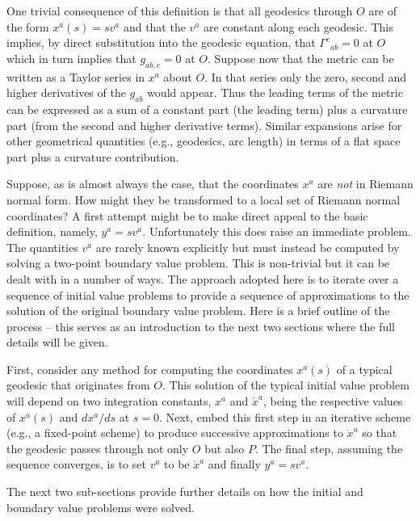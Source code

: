 \documentclass[a4paper,12pt]{article}
\numberwithin{equation}{section}
\begin{document}
One trivial consequence of this definition is that all geodesics through $O$ are of the form
$x^a(s) = s v^a$ and that the $v^a$ are constant along each geodesic. This implies, by
direct substitution into the geodesic equation, that $\Gamma^c{}_{ab}=0$ at $O$ which in
turn implies that $g_{ab,c}=0$ at $O$. Suppose now that the metric can be written as a
Taylor series in $x^a$ about $O$. In that series only the zero, second and higher
derivatives of the $g_{ab}$ would appear. Thus the leading terms of the metric can be
expressed as a sum of a constant part (the leading term) plus a curvature part (from the
second and higher derivative terms). Similar expansions arise for other geometrical
quantities (e.g., geodesics, arc length) in terms of a flat space part plus a curvature
contribution.

Suppose, as is almost always the case, that the coordinates $x^a$ are \emph{not} in Riemann
normal form. How might they be transformed to a local set of Riemann normal coordinates? A
first attempt might be to make direct appeal to the basic definition, namely, $y^a = s v^a$.
Unfortunately this does raise an immediate problem. The quantities $v^a$ are rarely known
explicitly but must instead be computed by solving a two-point boundary value problem. This
is non-trivial but it can be dealt with in a number of ways. The approach adopted here is
to iterate over a sequence of initial value problems to provide a sequence of approximations
to the solution of the original boundary value problem. Here is a brief outline of the
process -- this serves as an introduction to the next two sections where the full details
will be given.

First, consider any method for computing the coordinates $x^a(s)$ of a typical geodesic that
originates from $O$. This solution of the typical initial value problem will depend on two
integration constants, $x^a$ and ${\Dot x}^a$, being the respective values of $x^a(s)$ and
$dx^a/ds$ at $s=0$. Next, embed this first step in an iterative scheme (e.g., a fixed-point
scheme) to produce successive approximations to ${\Dot x}^a$ so that the geodesic passes
through not only $O$ but also $P$. The final step, assuming the sequence converges, is to set
$v^a$ to be ${\Dot x}^a$ and finally $y^a = s v^a$.

The next two sub-sections provide further details on how the initial and boundary value
problems were solved.

\end{document}
